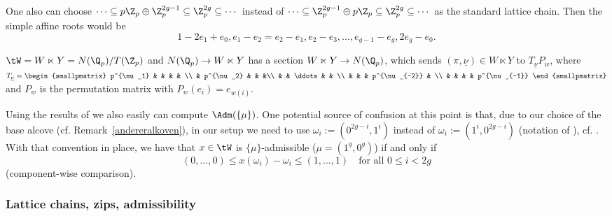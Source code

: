 \documentclass[a4paper]{scrartcl} %
\numberwithin{equation}{section}
\begin{document}
\begin{Remark}\label{andereralkoven}
  One also can choose $\dotsb \subseteq p\Z_p\oplus \Z_p^{2g-1}\subseteq \Z_p^{2g}\subseteq\dotsb$ instead of $\dotsb\subseteq \Z_p^{2g-1}\oplus p\Z_p\subseteq \Z_p^{2g}\subseteq\dotsb$ as the standard lattice chain. Then the simple affine roots would be
  \begin{equation*}
    1-2e_{1}+e_0, e_{1}-e_{2}=e_2-e_1, e_{2}-e_{3}, \dotsc, e_{g-1}-e_{g}, 2e_{g}-e_0.
  \end{equation*}
\end{Remark}

\begin{Remark}\label{iw-section}
  $\tW=W\ltimes Y=N(\Q_p)/T(\Z_p)$ and $N(\Q_p) \to W\ltimes Y$ has a section $W\ltimes Y\to N(\Q_p)$, which sends $(\pi,\underline{\nu})\in W\ltimes Y$ to $T_{\underline{\nu}}P_w$, where $T_{\underline{\nu}}=
\begin{smallpmatrix}
  p^{\nu_1} & & & & \\
  & p^{\nu_2} & & &\\
  & & \ddots & & \\
  & & & p^{\nu_{-2}} & \\
  & & & & p^{\nu_{-1}}
\end{smallpmatrix}$ and $P_w$ is the permutation matrix with $P_w(e_i)=e_{w(i)}$.
\end{Remark}


\begin{Remark}\label{kottrap}
  Using the results of \cite{kottrap} we also easily can compute $\Adm(\{\mu\})$. One potential source of confusion at this point is that, due to our choice of the base alcove (cf. Remark~\ref{andereralkoven}), in our setup we need to use $\omega_i:=(0^{2g-i},1^i)$ instead of $\omega_i:=(1^i,0^{2g-i})$ (notation of \cite{kottrap}), cf. \cite[1268]{yu}. With that convention in place, we have that $x\in\tW$ is $\{\mu\}$-admissible ($\mu=(1^g,0^g)$) if and only if
  \begin{equation*}
    (0,\dotsc,0) \leq x(\omega_i) - \omega_i \leq (1,\dotsc,1) \quad\text{for all } 0\leq i <2g
  \end{equation*}
  (component-wise comparison).
\end{Remark}


\subsubsection{Lattice chains, zips, admissibility}
\label{sec:lattice-chains-zips}
\end{document}
